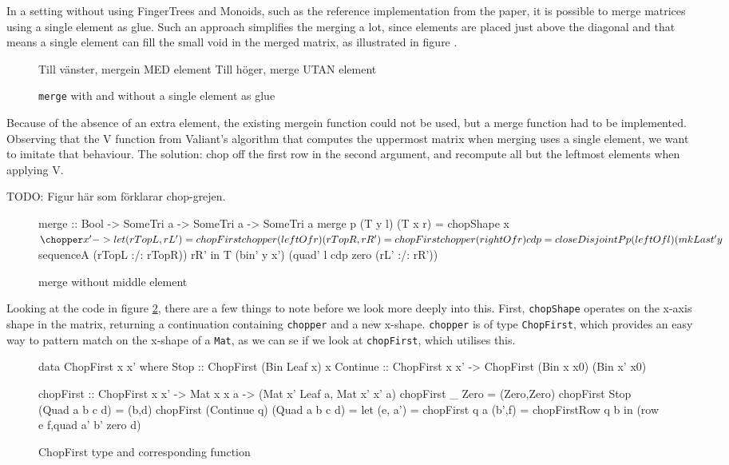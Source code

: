 \documentclass[a4paper,12pt,twosided]{report}
\begin{document}
In a setting without using FingerTrees and Monoids, such as the reference
implementation from the paper, it is possible to merge matrices using a single
element as glue. Such an approach simplifies the merging a lot, since elements
are placed just above the diagonal and that means a single element can fill the
small void in the merged matrix, as illustrated in figure \label{mergein}.

\begin{figure}[H]
Till vänster, mergein MED element
Till höger, merge UTAN element
\caption{\label{mergein}\texttt{merge} with and without a single element as glue}
\end{figure}

Because of the absence of an extra element, the existing mergein function could
not be used, but a merge function had to be implemented. Observing that the V
function from Valiant's algorithm that computes the uppermost matrix when
merging uses a single element, we want to imitate that behaviour. The solution:
chop off the first row in the second argument, and recompute all but the
leftmost elements when applying V. \label{chopsection}

TODO: Figur här som förklarar chop-grejen.

\begin{figure}[H]
\begin{code}
merge :: Bool -> SomeTri a -> SomeTri a -> SomeTri a
merge p (T y l) (T x r) = chopShape x $ \chopper x' ->
    let (rTopL, rL') = chopFirst chopper (leftOf r)
        (rTopR, rR') = chopFirst chopper (rightOf r)
        cdp = closeDisjointP p (leftOf l) 
                (mkLast' y $ sequenceA (rTopL :/: rTopR)) rR'
    in T (bin' y x') (quad' l cdp zero (rL' :/: rR'))
\end{code}
\caption{merge without middle element}
\label{merge}
\end{figure}

Looking at the code in figure \ref{merge}, there are a few things to note before
we look more deeply into this. First, \texttt{chopShape} operates on the x-axis
shape in the matrix, returning a continuation containing \texttt{chopper} and a
new x-shape. \texttt{chopper} is of type \texttt{ChopFirst}, which provides an
easy way to pattern match on the x-shape of a \texttt{Mat}, as we can se if we
look at \texttt{chopFirst}, which utilises this.

\begin{figure}[H]
\begin{code}
data ChopFirst x x' where
  Stop :: ChopFirst (Bin Leaf x) x
  Continue :: ChopFirst x x' -> ChopFirst (Bin x x0) (Bin x' x0)

chopFirst :: ChopFirst x x' -> Mat x x a  
                            -> (Mat x' Leaf a, Mat x' x' a)
chopFirst _ Zero = (Zero,Zero)
chopFirst Stop (Quad a b c d) = (b,d)
chopFirst (Continue q) (Quad a b c d) =
  let  (e, a') = chopFirst q a
       (b',f)  = chopFirstRow q b
  in (row e f,quad a' b' zero d)
\end{code}
\caption{\label{chopfirst} ChopFirst type and corresponding function}
\end{figure}
\end{document}

